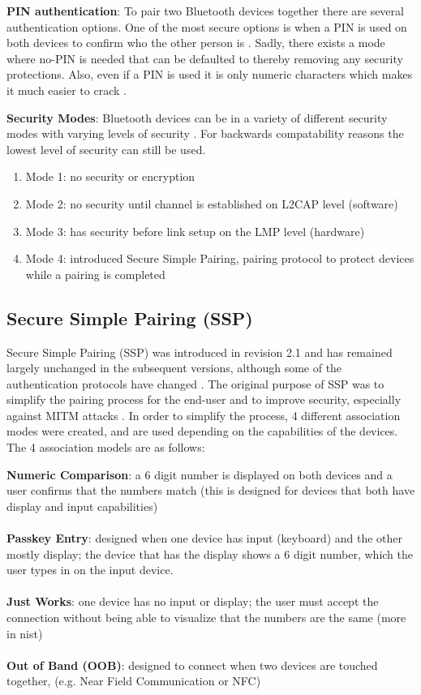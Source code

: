 \documentclass{acm_proc_article-sp}
\begin{document}
\textbf{PIN authentication}: To pair two Bluetooth devices together there are several authentication options. One of the most secure options is when a PIN is used on both devices to confirm who the other person is \cite{ma2007keystroke}. Sadly, there exists a mode where no-PIN is needed that can be defaulted to thereby removing any security protections. Also, even if a PIN is used it is only numeric characters which makes it much easier to crack \cite{ma2007keystroke}.

\textbf{Security Modes}: Bluetooth devices can be in a variety of different security modes with varying levels of security \cite{ma2007keystroke}. For backwards compatability reasons the lowest level of security can still be used.

\begin{enumerate}
\item Mode 1: no security or encryption
\item Mode 2: no security until channel is established on L2CAP level (software)
\item Mode 3: has security before link setup on the LMP level (hardware)
\item Mode 4: introduced Secure Simple Pairing, pairing protocol to protect devices while a pairing is completed
\end{enumerate}

\subsection{Secure Simple Pairing (SSP)}
Secure Simple Pairing (SSP) was introduced in revision 2.1 and has remained largely unchanged in the subsequent versions, although some of the authentication protocols have changed \cite{barnickel2012implementing}. The original purpose of SSP was to simplify the pairing process for the end-user and to improve security, especially against MITM attacks \cite{sandhya2012analysis}. In order to simplify the process, 4 different association modes were created, and are used depending on the capabilities of the devices. The 4 association models are as follows:

\textbf{Numeric Comparison}: a 6 digit number is displayed on both devices and a user confirms that the numbers match (this is designed for devices that both have display and input capabilities)\\\\
\textbf{Passkey Entry}: designed when one device has input (keyboard) and the other mostly display; the device that has the display shows a 6 digit number, which the user types in on the input device.\\\\
\textbf{Just Works}: one device has no input or display; the user must accept the connection without being able to visualize that the numbers are the same (more in nist)\\\\
\textbf{Out of Band (OOB)}: designed to connect when two devices are touched together, (e.g. Near Field Communication or NFC)\\\\
\end{document}
